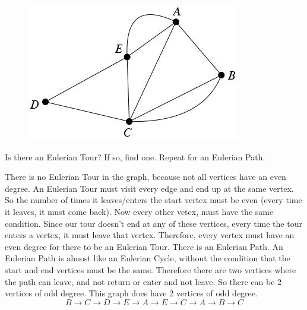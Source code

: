 \begin{figure}[h]
\includegraphics{find_tour}
\centering
\end{figure}

\question Is there an Eulerian Tour? If so, find one. Repeat for an 
Eulerian Path. \newline

\begin{solution}[0.2in] There is no Eulerian Tour in the graph, because 
not all vertices have an even degree. An Eulerian Tour must visit every 
edge and end up at the same vertex. So the number of times it leaves/enters 
the start vertex must be even (every time it leaves, it must come back). 
Now every other vetex, must have the same condition. Since our tour 
doesn't end at any of these vertices, every time the tour enters a vertex, 
it must leave that vertex. Therefore, every vertex must have an even 
degree for there to be an Eulerian Tour. \newline
There is an Eulerian Path. An Eulerian Path is almost like an Eulerian 
Cycle, without the condition that the start and end vertices must be 
the same. Therefore there are two vertices where the path can leave, 
and not return or enter and not leave. So there can be 2 vertices of 
odd degree. This graph does have 2 vertices of odd degree. 
\[B \rightarrow C \rightarrow D \rightarrow E \rightarrow A 
\rightarrow E \rightarrow C \rightarrow A \rightarrow B \rightarrow C\]
\end{solution}